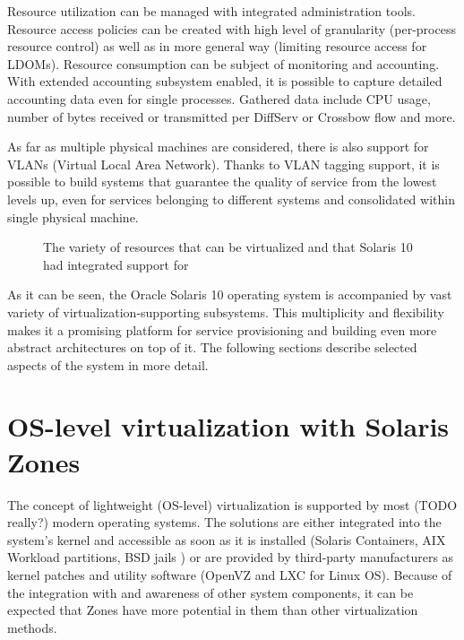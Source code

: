 \documentclass[11pt]{book}
\begin{document}
      Resource utilization can be managed with integrated administration tools. Resource access policies can be created with high
      level of granularity (per-process resource control) as well as in more general way (limiting resource access for
      LDOMs). Resource consumption can be subject of monitoring and accounting. With extended accounting subsystem
      enabled, it is possible to capture detailed accounting data even for single processes. Gathered data include CPU
      usage, number of bytes received or transmitted per DiffServ or Crossbow flow and more.

      As far as multiple physical machines are considered, there is also support for VLANs (Virtual Local Area Network).
      Thanks to VLAN tagging support, it is possible to build systems that guarantee the quality of service from the
      lowest levels up, even for services belonging to different systems and consolidated within single physical machine.

      \begin{figure}[H]

        \caption{The variety of resources that can be virtualized and that Solaris 10 had integrated support for}
      \end{figure}



      As it can be seen, the Oracle Solaris 10 operating system is accompanied by vast variety
      of virtualization-supporting subsystems. This multiplicity and flexibility makes it a promising
      platform for service provisioning and building even more abstract architectures on top of it. The following
      sections describe selected aspects of the system in more detail.


    \section{OS-level virtualization with Solaris Zones}
    \label{sec:sol:containers}



      The concept of lightweight (OS-level) virtualization is supported by most (TODO really?)
      modern operating systems. The solutions are either integrated into the system's kernel and accessible as soon as
      it is installed (Solaris Containers, AIX
      Workload partitions, BSD jails \cite{kamp}) or are provided by third-party manufacturers as kernel patches and utility
      software (OpenVZ and LXC for Linux OS). Because of the integration with and awareness of other system components,
      it can be expected that Zones have more potential in them than other virtualization methods.
\end{document}
